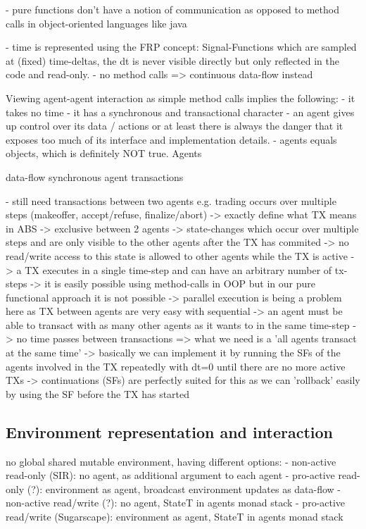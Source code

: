 - pure functions don't have a notion of communication as opposed to method calls in object-oriented languages like java

- time is represented using the FRP concept: Signal-Functions which are sampled at (fixed) time-deltas, the dt is never visible directly but only reflected in the code and read-only.
- no method calls => continuous data-flow instead
	
Viewing agent-agent interaction as simple method calls implies the following:
- it takes no time
- it has a synchronous and transactional character
- an agent gives up control over its data / actions or at least there is always the danger that it exposes too much of its interface and implementation details. 
- agents equals objects, which is definitely NOT true. Agents 

data-flow
synchronous agent transactions

- still need transactions between two agents e.g. trading occurs over multiple steps (makeoffer, accept/refuse, finalize/abort) 
		-> exactly define what TX means in ABS
			-> exclusive between 2 agents
			-> state-changes which occur over multiple steps and are only visible to the other agents after the TX has commited
			-> no read/write access to this state is allowed to other agents while the TX is active
			-> a TX executes in a single time-step and can have an arbitrary number of tx-steps
		-> it is easily possible using method-calls in OOP but in our pure functional approach it is not possible
		-> parallel execution is being a problem here as TX between agents are very easy with sequential
		-> an agent must be able to transact with as many other agents as it wants to in the same time-step
		-> no time passes between transactions
		=> what we need is a 'all agents transact at the same time'
			-> basically we can implement it by running the SFs of the agents involved in the TX repeatedly with dt=0 until there are no more active TXs
			-> continuations (SFs) are perfectly suited for this as we can 'rollback' easily by using the SF before the TX has started
		
\subsection{Environment representation and interaction}

no global shared mutable environment, having different options:
- non-active read-only (SIR): no agent, as additional argument to each agent
- pro-active read-only (?): environment as agent, broadcast environment updates as data-flow
- non-active read/write (?): no agent, StateT in agents monad stack
- pro-active read/write (Sugarscape): environment as agent, StateT in agents monad stack

